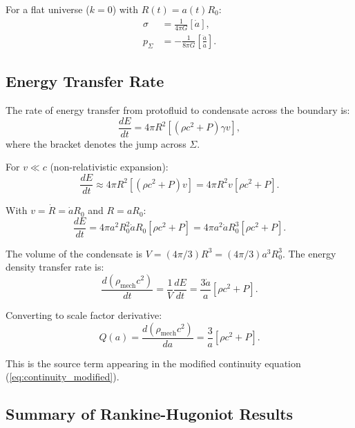 \documentclass[11pt,a4paper]{article}
\theoremstyle{definition}
\theoremstyle{remark}
\begin{document}
For a flat universe ($k=0$) with $R(t) = a(t)R_0$:
\begin{align}
\sigma &= \frac{1}{4\pi G}[\dot{a}], \\
p_\Sigma &= -\frac{1}{8\pi G}\left[\frac{\ddot{a}}{\dot{a}}\right].
\end{align}

\subsection{Energy Transfer Rate}
\label{sec:energy_transfer_rate}

The rate of energy transfer from protofluid to condensate across the boundary is:
\begin{equation}
\label{eq:energy_flux}
\frac{dE}{dt} = 4\pi R^2 \left[(\rho c^2 + P)\gamma v\right],
\end{equation}
where the bracket denotes the jump across $\Sigma$.

For $v \ll c$ (non-relativistic expansion):
\begin{equation}
\frac{dE}{dt} \approx 4\pi R^2 \left[(\rho c^2 + P)v\right] = 4\pi R^2 v [\rho c^2 + P].
\end{equation}

With $v = \dot{R} = \dot{a}R_0$ and $R = aR_0$:
\begin{equation}
\frac{dE}{dt} = 4\pi a^2 R_0^2 \dot{a} R_0 [\rho c^2 + P] = 4\pi a^2 \dot{a} R_0^3 [\rho c^2 + P].
\end{equation}

The volume of the condensate is $V = (4\pi/3)R^3 = (4\pi/3)a^3 R_0^3$. The energy density transfer rate is:
\begin{equation}
\frac{d(\rho_{\mathrm{mech}}c^2)}{dt} = \frac{1}{V}\frac{dE}{dt} = \frac{3\dot{a}}{a}[\rho c^2 + P].
\end{equation}

Converting to scale factor derivative:
\begin{equation}
\label{eq:source_term_rh}
Q(a) = \frac{d(\rho_{\mathrm{mech}}c^2)}{da} = \frac{3}{a}[\rho c^2 + P].
\end{equation}

This is the source term appearing in the modified continuity equation (\ref{eq:continuity_modified}).

\subsection{Summary of Rankine-Hugoniot Results}
\label{sec:rh_summary}
\end{document}
